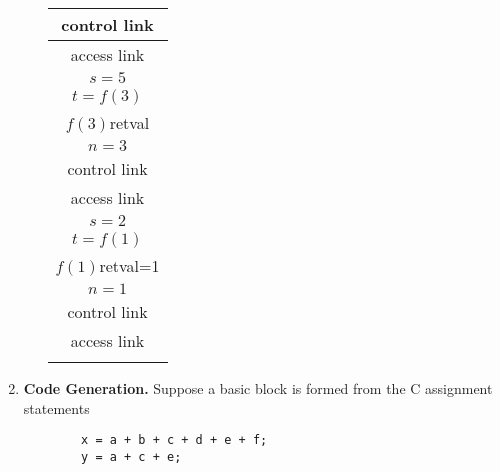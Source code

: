 \documentclass[10pt]{article}
\begin{document}
\begin{enumerate}
\begin{enumerate}
{\begin{tabular}{|c|}
                    \hline
                    control link   \\
                    \hline
                    access link    \\
                    \hline
                    $s=5$          \\
                    \hline
                    $t=f(3)$       \\
                    \hline
                    $f(3)$retval   \\
                    \hline
                    $n=3$          \\
                    \hline
                    control link   \\
                    \hline
                    access link    \\
                    \hline
                    $s=2$          \\
                    \hline
                    $t=f(1)$       \\
                    \hline
                    $f(1)$retval=1 \\
                    \hline
                    $n=1$          \\
                    \hline
                    control link   \\
                    \hline
                    access link    \\
                    \hline
                    \\
                  \end{tabular}
                }
        \end{enumerate}
  \item \textbf{Code Generation. } Suppose a basic block is formed from the C assignment statements
        \begin{verbatim}
        x = a + b + c + d + e + f;
        y = a + c + e;
    \end{verbatim}
\end{enumerate}
\end{document}

